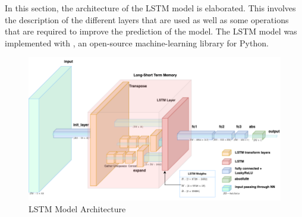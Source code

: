   In this section, the architecture of the LSTM model is elaborated.
  This involves the description of the different layers that are used as well as some operations that are required to improve the prediction of the model.
  The LSTM model was implemented with , an open-source machine-learning library for Python. 
  \begin{figure}
    \centering
    \includegraphics[scale=0.45]{figures/current_lstm_model.png}
    \caption{LSTM Model Architecture}
    \label{fig:lstm-model-architecture}
  \end{figure}

